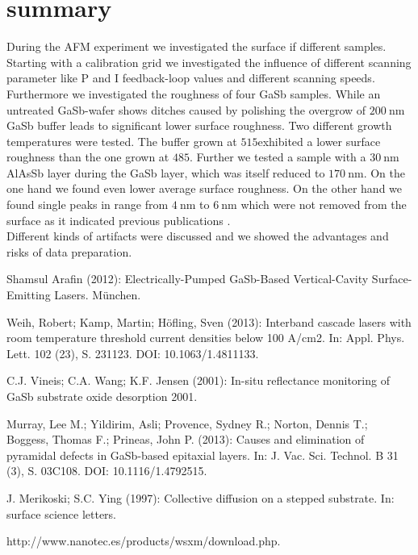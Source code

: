\documentclass[paper=a4,fontsize=10pt,DIV=18,twocolumn,parskip=half]{scrartcl}
\numberwithin{equation}{section}    %
\begin{document}
\section{summary}
During the AFM experiment we investigated the surface if different samples.  
Starting with a calibration grid we investigated the influence of different 
scanning parameter like P and I feedback-loop values and different scanning 
speeds. Furthermore we investigated the roughness of four GaSb samples. While an 
untreated GaSb-wafer shows ditches caused by polishing the overgrow of 
$\SI{200}{\nano\meter}$ GaSb buffer leads to significant lower surface 
roughness. Two different growth temperatures were tested.
The buffer grown at $515$\textdegree exhibited a lower surface roughness than 
the one grown at $485$\textdegree. Further we tested a sample with a 
$\SI{30}{\nano\meter}$ AlAsSb layer during the GaSb layer, which was itself 
reduced to $\SI{170}{\nano\meter}$. On the one hand we found even lower average 
surface roughness. On the other hand we found single peaks in range from 
$\SI{4}{\nano\meter}$ to $\SI{6}{\nano\meter}$ which were not removed from the 
surface as it indicated previous publications \cite{murray}.\\
Different kinds of artifacts were discussed and we showed the advantages and 
risks of data preparation.

\begin{thebibliography}{}   

 Shamsul Arafin (2012): Electrically-Pumped GaSb-Based 
Vertical-Cavity Surface-Emitting Lasers. München.

 Weih, Robert; Kamp, Martin; Höfling, Sven (2013): Interband 
cascade lasers with room temperature threshold current densities below 100 
A/cm2. In: Appl. Phys. Lett. 102 (23), S. 231123. DOI: 10.1063/1.4811133.

 C.J. Vineis; C.A. Wang; K.F. Jensen (2001): In-situ reflectance 
monitoring of GaSb substrate oxide desorption 2001.

 Murray, Lee M.; Yildirim, Asli; Provence, Sydney R.; Norton, 
Dennis T.; Boggess, Thomas F.; Prineas, John P. (2013): Causes and elimination 
of pyramidal defects in GaSb-based epitaxial layers. In: J. Vac. Sci. Technol. B 
31 (3), S. 03C108. DOI: 10.1116/1.4792515.
  
 J. Merikoski; S.C. Ying (1997): Collective diffusion on a stepped substrate. In: surface science letters.

 http://www.nanotec.es/products/wsxm/download.php. 
\end{thebibliography}
%
%
\onecolumn
\pagestyle{empty}
\appendix

\end{document}
